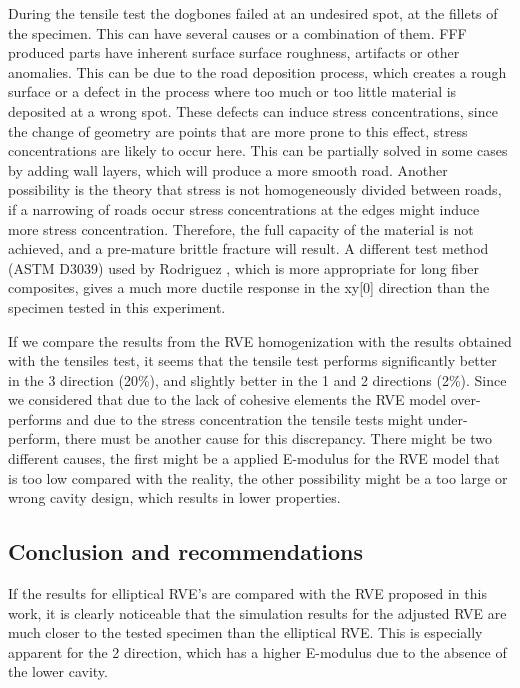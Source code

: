 During the tensile test the dogbones failed at an undesired spot, at the fillets of the specimen. This can have several causes or a combination of them. FFF produced parts have inherent surface surface roughness, artifacts or other anomalies. This can be due to the road deposition process, which creates a rough surface or a defect in the process where too much or too little material is deposited at a wrong spot. These defects can induce stress concentrations, since the change of geometry are points that are more prone to this effect, stress concentrations are likely to occur here. This can be partially solved in some cases by adding wall layers, which will produce a more smooth road. Another possibility is the theory that stress is not homogeneously divided between roads, if a narrowing of roads occur stress concentrations at the edges might induce more stress concentration. Therefore, the full capacity of the material is not achieved, and a pre-mature brittle fracture will result. A different test method (ASTM D3039) used by Rodriguez \cite{Rodriguez2001MechanicalInvestigation}, which is more appropriate for long fiber composites, gives a much more ductile response in the xy[0] direction than the specimen tested in this experiment. 

If we compare the results from the RVE homogenization with the results obtained with the tensiles test, it seems that the tensile test performs significantly better in the 3 direction (20\%), and slightly better in the 1 and 2 directions (2\%). Since we considered that due to the lack of cohesive elements the RVE model over-performs and due to the stress concentration the tensile tests might under-perform, there must be another cause for this discrepancy. There might be two different causes, the first might be a applied E-modulus for the RVE model that is too low compared with the reality, the other possibility might be a too large or wrong cavity design, which results in lower properties.

\subsection{Conclusion and recommendations}
If the results for elliptical RVE's are compared with the RVE proposed in this work, it is clearly noticeable that the simulation results for the adjusted RVE are much closer to the tested specimen than the elliptical RVE. This is especially apparent for the 2 direction, which has a higher E-modulus due to the absence of the lower cavity. 

